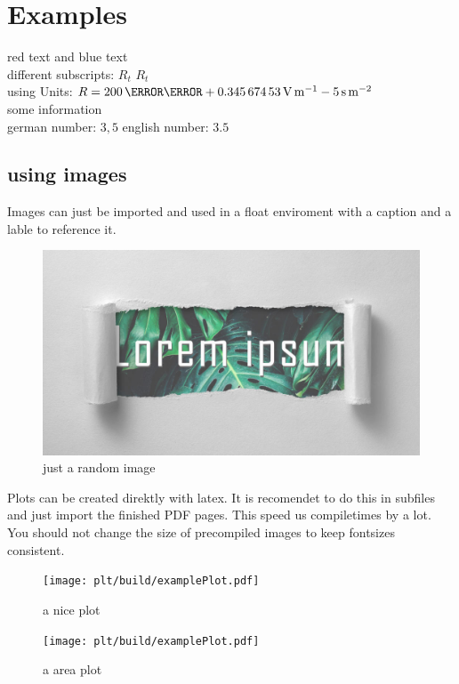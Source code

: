 \documentclass[	%
		11pt,a4paper,	%
		twoside,		%
		english,		%
		f1				%
	]{HsH-report}		%
\begin{document}
\maketitle				%
\declarationAuthorship

\begin{abstract}
	\lipsum[5-8]
\end{abstract}

\tableofcontents

\cleardoublepage %

\chapter{Examples}
	\label{chap: one}
	{\color{red}red text} and {\color{blue}blue text} \\
	different subscripts: \normalsubscripts$R_t$ \upsubscripts$R_t$ \\
	using Units: $R=200\,\milli\ohm + \SI{0.34567453}{\volt\per\metre} - 5\,\si{\second\per\metre\squared}$ \\
	some information\cite{laboranleitung:physik}\\
	german number: $3,5$ english number: $3.5$\\ %

	\section{using images}
	Images can just be imported and used in a float enviroment with a caption and a lable to reference it.
	\begin{figure}
		\includegraphics[width=.6\textwidth]{img/lorem-ipsum.jpg}
		\caption{just a random image}
	\end{figure}

	Plots can be created direktly with latex. It is recomendet to do this in subfiles and just import the finished PDF pages. This speed us
	compiletimes by a lot. You should not change the size of precompiled images to keep fontsizes consistent.
	\pagebreak
	\begin{figure}
		\texttt{[image: plt/build/examplePlot.pdf]}
		\caption[centering]{a nice plot}
		\label{fig: plot1}
	\end{figure}
	\begin{figure}
		\texttt{[image: plt/build/examplePlot.pdf]}
		\caption{a area plot}
		\label{fig: area}
	\end{figure}
\end{document}
